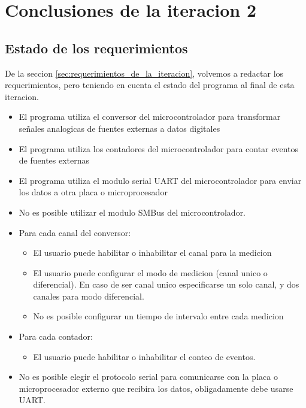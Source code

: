 \section{Conclusiones de la iteracion 2} %
\label{it2:sec:conclusiones_de_la_iteracion_2}


\subsection{Estado de los requerimientos} %
\label{it2:sub:estado_de_los_requerimientos}


De la seccion \ref{sec:requerimientos_de_la_iteracion}, volvemos a redactar los requerimientos, pero teniendo en cuenta el estado del programa al final de esta iteracion.

\begin{itemize}
\item El programa utiliza el conversor del microcontrolador para transformar señales analogicas de fuentes externas a datos digitales
\item El programa utiliza los contadores del microcontrolador para contar eventos de fuentes externas
\item El programa utiliza el modulo serial UART del microcontrolador para enviar los datos a otra placa o microprocesador
\item No es posible utilizar el modulo SMBus del microcontrolador.
\item Para cada canal del conversor:
\begin{itemize}
\item El usuario puede habilitar o inhabilitar el canal para la medicion
\item El usuario puede configurar el modo de medicion (canal unico o diferencial). En caso de ser canal unico especificarse un solo canal, y dos canales para modo diferencial.
\item No es posible configurar un tiempo de intervalo entre cada medicion
\end{itemize}
\item Para cada contador:
\begin{itemize}
\item El usuario puede habilitar o inhabilitar el conteo de eventos.
\end{itemize}
\item No es posible elegir el protocolo serial para comunicarse con la placa o microprocesador externo que recibira los datos, obligadamente debe usarse UART.

\end{itemize}

